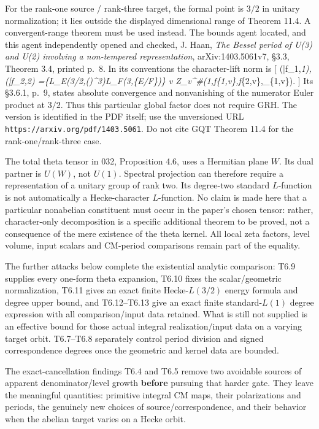 \documentclass[11pt,a4paper]{article}
\theoremstyle{definition}
\begin{document}
For the rank-one source / rank-three target, the formal point is \(3/2\)
in unitary normalization; it lies outside the displayed dimensional
range of Theorem 11.4. A convergent-range theorem must be used instead.
The bounds agent located, and this agent independently opened and
checked, J. Haan, \emph{The Bessel period of U(3) and U(2) involving a
non-tempered representation}, arXiv:1403.5061v7, §3.3, Theorem 3.4,
printed p.~8. In its conventions the character-lift norm is {[}
\langle\theta(\bar f\_1,\phi\emph{1),\theta(\bar f\_2,\phi\emph{2)\rangle
=\{L\_E(3/2,(\tau)\otimes\gamma\^{}3)\over L\_F(3,\epsilon}\{E/F\})\}
\prod\emph{v Z\_v\^{}\#(1,f}\{1,v\},f}\{2,v\},\Phi\_\{1,v\}). {]} Its
§3.6.1, p.~9, states absolute convergence and nonvanishing of the
numerator Euler product at \(3/2\). Thus this particular global factor
does not require GRH. The version is identified in the PDF itself; use
the unversioned URL \texttt{https://arxiv.org/pdf/1403.5061}. Do not
cite GQT Theorem 11.4 for the rank-one/rank-three case.

The total theta tensor in 032, Proposition 4.6, uses a Hermitian plane
\(W\). Its dual partner is \(U(W)\), not \(U(1)\). Spectral projection
can therefore require a representation of a unitary group of rank two.
Its degree-two standard \(L\)-function is not automatically a
Hecke-character \(L\)-function. No claim is made here that a particular
nonabelian constituent must occur in the paper's chosen tensor: rather,
character-only decomposition is a specific additional theorem to be
proved, not a consequence of the mere existence of the theta kernel. All
local zeta factors, level volume, input scalars and CM-period
comparisons remain part of the equality.

The further attacks below complete the existential analytic comparison:
T6.9 supplies every one-form theta expansion, T6.10 fixes the
scalar/geometric normalization, T6.11 gives an exact finite
Hecke-\(L(3/2)\) energy formula and degree upper bound, and T6.12--T6.13
give an exact finite standard-\(L(1)\) degree expression with all
comparison/input data retained. What is still not supplied is an
effective bound for those actual integral realization/input data on a
varying target orbit. T6.7--T6.8 separately control period division and
signed correspondence degrees once the geometric and kernel data are
bounded.

The exact-cancellation findings T6.4 and T6.5 remove two avoidable
sources of apparent denominator/level growth \textbf{before} pursuing
that harder gate. They leave the meaningful quantities: primitive
integral CM maps, their polarizations and periods, the genuinely new
choices of source/correspondence, and their behavior when the abelian
target varies on a Hecke orbit.
\end{document}
